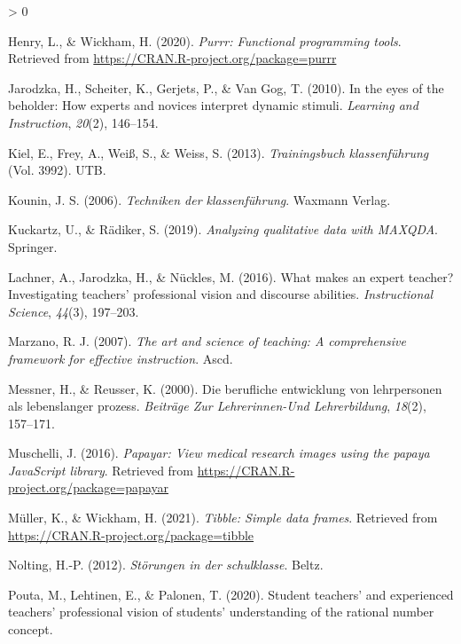\documentclass[
  english,
  man,floatsintext]{apa6}
\newlength{\cslhangindent}
\newenvironment{CSLReferences}[2] %
 {%
  \setlength{\parindent}{0pt}
  \ifodd #1 \everypar{\setlength{\hangindent}{\cslhangindent}}\ignorespaces\fi
  \ifnum #2 > 0
  \setlength{\parskip}{#2\baselineskip}
  \fi
 }%
 {}
\begin{document}
\begin{CSLReferences}{1}{0}
\leavevmode\hypertarget{ref-R-purrr}{}%
Henry, L., \& Wickham, H. (2020). \emph{Purrr: Functional programming tools}. Retrieved from \url{https://CRAN.R-project.org/package=purrr}

\leavevmode\hypertarget{ref-jarodzka2010eyes}{}%
Jarodzka, H., Scheiter, K., Gerjets, P., \& Van Gog, T. (2010). In the eyes of the beholder: How experts and novices interpret dynamic stimuli. \emph{Learning and Instruction}, \emph{20}(2), 146--154.

\leavevmode\hypertarget{ref-kiel2013trainingsbuch}{}%
Kiel, E., Frey, A., Weiß, S., \& Weiss, S. (2013). \emph{Trainingsbuch klassenf{ü}hrung} (Vol. 3992). UTB.

\leavevmode\hypertarget{ref-kounin2006techniken}{}%
Kounin, J. S. (2006). \emph{Techniken der klassenf{ü}hrung}. Waxmann Verlag.

\leavevmode\hypertarget{ref-kuckartz2019analyzing}{}%
Kuckartz, U., \& Rädiker, S. (2019). \emph{Analyzing qualitative data with MAXQDA}. Springer.

\leavevmode\hypertarget{ref-lachner2016makes}{}%
Lachner, A., Jarodzka, H., \& Nückles, M. (2016). What makes an expert teacher? Investigating teachers' professional vision and discourse abilities. \emph{Instructional Science}, \emph{44}(3), 197--203.

\leavevmode\hypertarget{ref-marzano2007art}{}%
Marzano, R. J. (2007). \emph{The art and science of teaching: A comprehensive framework for effective instruction}. Ascd.

\leavevmode\hypertarget{ref-messner2000berufliche}{}%
Messner, H., \& Reusser, K. (2000). Die berufliche entwicklung von lehrpersonen als lebenslanger prozess. \emph{Beitr{ä}ge Zur Lehrerinnen-Und Lehrerbildung}, \emph{18}(2), 157--171.

\leavevmode\hypertarget{ref-R-papayar}{}%
Muschelli, J. (2016). \emph{Papayar: View medical research images using the papaya JavaScript library}. Retrieved from \url{https://CRAN.R-project.org/package=papayar}

\leavevmode\hypertarget{ref-R-tibble}{}%
Müller, K., \& Wickham, H. (2021). \emph{Tibble: Simple data frames}. Retrieved from \url{https://CRAN.R-project.org/package=tibble}

\leavevmode\hypertarget{ref-nolting2012storungen}{}%
Nolting, H.-P. (2012). \emph{St{ö}rungen in der schulklasse}. Beltz.

\leavevmode\hypertarget{ref-pouta2020student}{}%
Pouta, M., Lehtinen, E., \& Palonen, T. (2020). Student teachers' and experienced teachers' professional vision of students' understanding of the rational number concept.


\end{CSLReferences}
\end{document}
